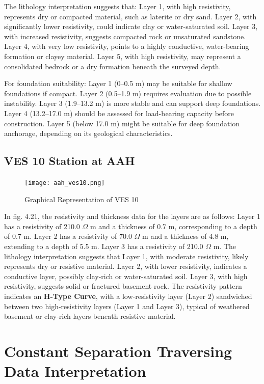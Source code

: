 \documentclass[12pt,a4paper]{report}
\begin{document}
The lithology interpretation suggests that: Layer 1, with high resistivity, represents dry or compacted material, such as laterite or dry sand.  
Layer 2, with significantly lower resistivity, could indicate clay or water-saturated soil.  
Layer 3, with increased resistivity, suggests compacted rock or unsaturated sandstone.  
Layer 4, with very low resistivity, points to a highly conductive, water-bearing formation or clayey material.  
Layer 5, with high resistivity, may represent a consolidated bedrock or a dry formation beneath the surveyed depth.  

For foundation suitability: Layer 1 (0--0.5 m) may be suitable for shallow foundations if compact.  
Layer 2 (0.5--1.9 m) requires evaluation due to possible instability.  
Layer 3 (1.9--13.2 m) is more stable and can support deep foundations.  
Layer 4 (13.2--17.0 m) should be assessed for load-bearing capacity before construction.  
Layer 5 (below 17.0 m) might be suitable for deep foundation anchorage, depending on its geological characteristics.  

\subsection{VES 10 Station at AAH}

\begin{figure}[H]
    \centering
    \texttt{[image: aah\_ves10.png]}
    \caption{Graphical Representation of VES 10}
    \label{fig:AAH_VES_10_Curve}
\end{figure}
In fig. 4.21, the resistivity and thickness data for the layers are as follows: Layer 1 has a resistivity of 210.0 $\Omega$ m and a thickness of 0.7 m, corresponding to a depth of 0.7 m. Layer 2 has a resistivity of 70.0 $\Omega$ m and a thickness of 4.8 m, extending to a depth of 5.5 m. Layer 3 has a resistivity of 210.0 $\Omega$ m. The lithology interpretation suggests that Layer 1, with moderate resistivity, likely represents dry or resistive material. Layer 2, with lower resistivity, indicates a conductive layer, possibly clay-rich or water-saturated soil. Layer 3, with high resistivity, suggests solid or fractured basement rock. The resistivity pattern indicates an \textbf{H-Type Curve}, with a low-resistivity layer (Layer 2) sandwiched between two high-resistivity layers (Layer 1 and Layer 3), typical of weathered basement or clay-rich layers beneath resistive material.

\section{Constant Separation Traversing Data Interpretation}
\end{document}
